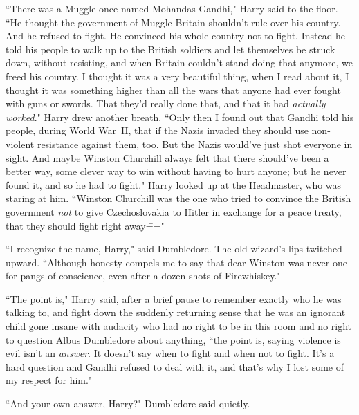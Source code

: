 ``There was a Muggle once named Mohandas Gandhi," Harry said to the floor. ``He thought the government of Muggle Britain shouldn't rule over his country. And he refused to fight. He convinced his whole country not to fight. Instead he told his people to walk up to the British soldiers and let themselves be struck down, without resisting, and when Britain couldn't stand doing that anymore, we freed his country. I thought it was a very beautiful thing, when I read about it, I thought it was something higher than all the wars that anyone had ever fought with guns or swords. That they'd really done that, and that it had \emph{actually worked}." Harry drew another breath. ``Only then I found out that Gandhi told his people, during World War~II, that if the Nazis invaded they should use non-violent resistance against them, too. But the Nazis would've just shot everyone in sight. And maybe Winston Churchill always felt that there should've been a better way, some clever way to win without having to hurt anyone; but he never found it, and so he had to fight." Harry looked up at the Headmaster, who was staring at him. ``Winston Churchill was the one who tried to convince the British government \emph{not} to give Czechoslovakia to Hitler in exchange for a peace treaty, that they should fight right away\==="

``I recognize the name, Harry," said Dumbledore. The old wizard's lips twitched upward. ``Although honesty compels me to say that dear Winston was never one for pangs of conscience, even after a dozen shots of Firewhiskey."

``The point is," Harry said, after a brief pause to remember exactly who he was talking to, and fight down the suddenly returning sense that he was an ignorant child gone insane with audacity who had no right to be in this room and no right to question Albus Dumbledore about anything, ``the point is, saying violence is evil isn't an \emph{answer}. It doesn't say when to fight and when not to fight. It's a hard question and Gandhi refused to deal with it, and that's why I lost some of my respect for him."

``And your own answer, Harry?" Dumbledore said quietly.

